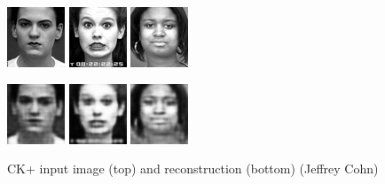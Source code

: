 \documentclass{article}
\begin{document}
    \begin{figure}[h]
      \centering
      \includegraphics[width=0.2\linewidth]{../graphics/reconstructions/ckplus/input_00.png}
      \includegraphics[width=0.2\linewidth]{../graphics/reconstructions/ckplus/input_01.png}
      \includegraphics[width=0.2\linewidth]{../graphics/reconstructions/ckplus/input_02.png}

      \includegraphics[width=0.2\linewidth]{../graphics/reconstructions/ckplus/reconstruction_00.png}
      \includegraphics[width=0.2\linewidth]{../graphics/reconstructions/ckplus/reconstruction_01.png}
      \includegraphics[width=0.2\linewidth]{../graphics/reconstructions/ckplus/reconstruction_02.png}

      \caption{CK+ input image (top) and reconstruction (bottom) ({\textcopyright}Jeffrey Cohn)}
      \label{fig:ckplus_reconstructions}
    \end{figure}
\end{document}
